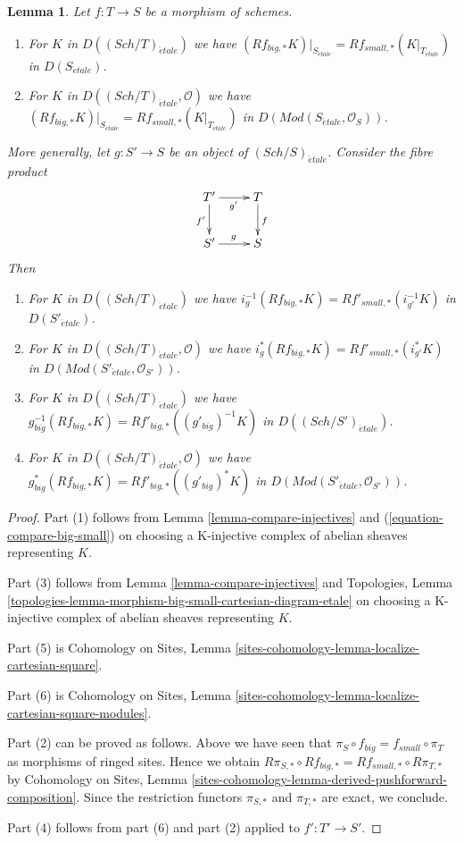 \documentclass[10pt,a4paper]{amsart}
\theoremstyle{plain}
\newtheorem{lemma}[subsection]{Lemma}
\theoremstyle{definition}
\theoremstyle{remark}
\numberwithin{equation}{subsection}
\def\Sch{\mathit{Sch}}
\def\etale{{\acute{e}tale}}
\begin{document}
\begin{lemma}
\label{lemma-compare-higher-direct-image}
Let $f : T \to S$ be a morphism of schemes.
\begin{enumerate}
\item For $K$ in $D((\Sch/T)_\etale)$ we have
$
(Rf_{big, *}K)|_{S_\etale} = Rf_{small, *}(K|_{T_\etale})
$
in $D(S_\etale)$.
\item For $K$ in $D((\Sch/T)_\etale, \mathcal{O})$ we have
$
(Rf_{big, *}K)|_{S_\etale} = Rf_{small, *}(K|_{T_\etale})
$
in $D(\textit{Mod}(S_\etale, \mathcal{O}_S))$.
\end{enumerate}
More generally, let $g : S' \to S$ be an object of $(\Sch/S)_\etale$.
Consider the fibre product
$$
\xymatrix{
T' \ar[r]_{g'} \ar[d]_{f'} & T \ar[d]^f \\
S' \ar[r]^g & S
}
$$
Then
\begin{enumerate}
\item[(3)] For $K$ in $D((\Sch/T)_\etale)$ we have
$i_g^{-1}(Rf_{big, *}K) = Rf'_{small, *}(i_{g'}^{-1}K)$
in $D(S'_\etale)$.
\item[(4)] For $K$ in $D((\Sch/T)_\etale, \mathcal{O})$ we have
$i_g^*(Rf_{big, *}K) = Rf'_{small, *}(i_{g'}^*K)$
in $D(\textit{Mod}(S'_\etale, \mathcal{O}_{S'}))$.
\item[(5)] For $K$ in $D((\Sch/T)_\etale)$ we have
$g_{big}^{-1}(Rf_{big, *}K) = Rf'_{big, *}((g'_{big})^{-1}K)$
in $D((\Sch/S')_\etale)$.
\item[(6)] For $K$ in $D((\Sch/T)_\etale, \mathcal{O})$ we have
$g_{big}^*(Rf_{big, *}K) = Rf'_{big, *}((g'_{big})^*K)$
in $D(\textit{Mod}(S'_\etale, \mathcal{O}_{S'}))$.
\end{enumerate}
\end{lemma}

\begin{proof}
Part (1) follows from
Lemma \ref{lemma-compare-injectives}
and (\ref{equation-compare-big-small})
on choosing a K-injective complex of abelian sheaves representing $K$.

\medskip\noindent
Part (3) follows from Lemma \ref{lemma-compare-injectives}
and Topologies, Lemma
\ref{topologies-lemma-morphism-big-small-cartesian-diagram-etale}
on choosing a K-injective complex of abelian sheaves representing $K$.

\medskip\noindent
Part (5) is Cohomology on Sites, Lemma
\ref{sites-cohomology-lemma-localize-cartesian-square}.

\medskip\noindent
Part (6) is Cohomology on Sites, Lemma
\ref{sites-cohomology-lemma-localize-cartesian-square-modules}.

\medskip\noindent
Part (2) can be proved as follows. Above we have seen
that $\pi_S \circ f_{big} = f_{small} \circ \pi_T$ as morphisms
of ringed sites. Hence we obtain
$R\pi_{S, *} \circ Rf_{big, *} = Rf_{small, *} \circ R\pi_{T, *}$
by Cohomology on Sites, Lemma
\ref{sites-cohomology-lemma-derived-pushforward-composition}.
Since the restriction functors $\pi_{S, *}$ and $\pi_{T, *}$
are exact, we conclude.

\medskip\noindent
Part (4) follows from part (6) and part (2) applied to $f' : T' \to S'$.
\end{proof}
\end{document}

